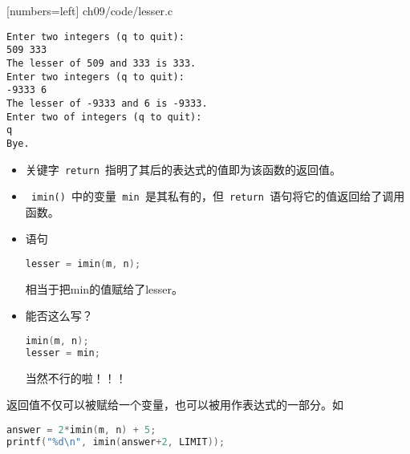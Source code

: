 \begin{frame}

[numbers=left]
{ch09/code/lesser.c}
\end{frame}

\begin{frame}[fragile]

\begin{lstlisting}[backgroundcolor=\color{red!10}]
Enter two integers (q to quit):
509 333
The lesser of 509 and 333 is 333.
Enter two integers (q to quit):
-9333 6
The lesser of -9333 and 6 is -9333.
Enter two of integers (q to quit):
q
Bye.
\end{lstlisting}
\end{frame}

\begin{frame}[fragile]
\begin{itemize}
\item
关键字\lstinline| return |指明了其后的表达式的值即为该函数的返回值。\\[0.1in]
\item 
\lstinline| imin() |中的变量\lstinline| min |是其私有的，但\lstinline| return |语句将它的值返回给了调用函数。\\[0.1in]
\item 
语句
\begin{lstlisting}[language=c,backgroundcolor=\color{red!10}]
lesser = imin(m, n);
\end{lstlisting}
相当于把min的值赋给了lesser。
\\[0.1in]
\item
能否这么写？
\begin{lstlisting}[language=c,backgroundcolor=\color{red!10}]
imin(m, n);
lesser = min;
\end{lstlisting} \pause
{\Huge 当然不行的啦！！！}
\end{itemize}
\end{frame}

\begin{frame}[fragile]
返回值不仅可以被赋给一个变量，也可以被用作表达式的一部分。如
\begin{lstlisting}[language=c,backgroundcolor=\color{red!10}]
answer = 2*imin(m, n) + 5;
printf("%d\n", imin(answer+2, LIMIT));
\end{lstlisting}

\end{frame}

